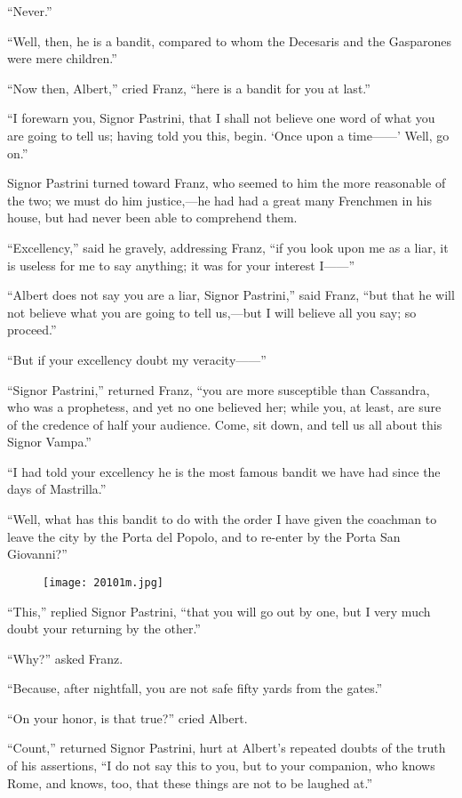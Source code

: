 “Never.”

“Well, then, he is a bandit, compared to whom the Decesaris and the
Gasparones were mere children.”

“Now then, Albert,” cried Franz, “here is a bandit for you at last.”

“I forewarn you, Signor Pastrini, that I shall not believe one word of
what you are going to tell us; having told you this, begin. ‘Once upon
a time——’ Well, go on.”

Signor Pastrini turned toward Franz, who seemed to him the more
reasonable of the two; we must do him justice,—he had had a great many
Frenchmen in his house, but had never been able to comprehend them.

“Excellency,” said he gravely, addressing Franz, “if you look upon me
as a liar, it is useless for me to say anything; it was for your
interest I——”

“Albert does not say you are a liar, Signor Pastrini,” said Franz, “but
that he will not believe what you are going to tell us,—but I will
believe all you say; so proceed.”

“But if your excellency doubt my veracity——”

“Signor Pastrini,” returned Franz, “you are more susceptible than
Cassandra, who was a prophetess, and yet no one believed her; while
you, at least, are sure of the credence of half your audience. Come,
sit down, and tell us all about this Signor Vampa.”

“I had told your excellency he is the most famous bandit we have had
since the days of Mastrilla.”

“Well, what has this bandit to do with the order I have given the
coachman to leave the city by the Porta del Popolo, and to re-enter by
the Porta San Giovanni?”

\begin{figure}[ht]
\texttt{[image: 20101m.jpg]}
\end{figure}

“This,” replied Signor Pastrini, “that you will go out by one, but I
very much doubt your returning by the other.”

“Why?” asked Franz.

“Because, after nightfall, you are not safe fifty yards from the
gates.”

“On your honor, is that true?” cried Albert.

“Count,” returned Signor Pastrini, hurt at Albert’s repeated doubts of
the truth of his assertions, “I do not say this to you, but to your
companion, who knows Rome, and knows, too, that these things are not to
be laughed at.”

